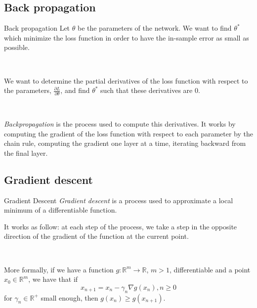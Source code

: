 \documentclass[11pt]{beamer}
\begin{document}
\subsection{Back propagation}
\begin{frame}{Back propagation}
Let $\theta$ be the parameters of the network. We want to find $\theta^*$ which minimize the loss function in order to have the in-sample error as small as possible. 

~

We want to determine the partial derivatives of the loss function with respect to the parameters, $\frac{\partial L}{\partial \theta}$, and find $\theta^*$ such that these derivatives are $0$.

~

\textit{Backpropagation} \cite{11} is the process used to compute this derivatives. It works by computing the gradient of the loss function with respect to each parameter by the chain rule, computing the gradient one layer at a time, iterating backward from the final layer.
\end{frame}

\subsection{Gradient descent}
\begin{frame}{Gradient Descent}
\textit{Gradient descent} \cite{1} is a process used to approximate a local minimum of a differentiable function. 

It works as follow: at each step of the process, we take a step in the opposite direction of the gradient of the function at the current point.

~

More formally, if we have a function $g: \mathbb{R}^m \rightarrow \mathbb{R}$, $m>1$, differentiable and a point $x_0\in \mathbb{R}^m$, we have that if
$$
x_{n+1} = x_n -\gamma_n \nabla g(x_n), n\geq 0
$$
for $\gamma_n \in \mathbb{R}^+$ small enough, then $g(x_n) \geq g(x_{n+1})$. 

\end{frame}
\end{document}
